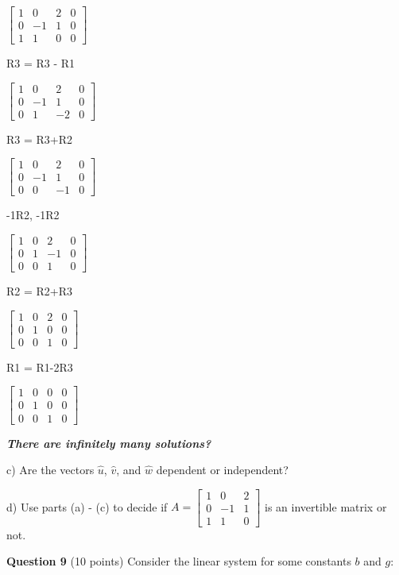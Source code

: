 \documentclass{article}
\begin{document}
$\begin{bmatrix}
    1 & 0 & 2 & 0 \\
    0 & -1 & 1 & 0 \\
    1 & 1 & 0 & 0
\end{bmatrix}$

R3 = R3 - R1

$\begin{bmatrix}
    1 & 0 & 2 & 0 \\
    0 & -1 & 1 & 0 \\
    0 & 1 & -2 & 0
\end{bmatrix}$

R3 = R3+R2

$\begin{bmatrix}
    1 & 0 & 2 & 0 \\
    0 & -1 & 1 & 0 \\
    0 & 0 & -1 & 0
\end{bmatrix}$

-1R2, -1R2

$\begin{bmatrix}
    1 & 0 & 2 & 0 \\
    0 & 1 & -1 & 0 \\
    0 & 0 & 1 & 0
\end{bmatrix}$

R2 = R2+R3

$\begin{bmatrix}
    1 & 0 & 2 & 0 \\
    0 & 1 & 0 & 0 \\
    0 & 0 & 1 & 0
\end{bmatrix}$

R1 = R1-2R3

$\begin{bmatrix}
    1 & 0 & 0 & 0 \\
    0 & 1 & 0 & 0 \\
    0 & 0 & 1 & 0
\end{bmatrix}$

\textbf{\textit{There are infinitely many solutions?}}

c) Are the vectors $\hat{u}$, $\hat{v}$, and $\hat{w}$ dependent or independent?

d) Use parts (a) - (c) to decide if $A = \begin{bmatrix}
    1 & 0 & 2 \\
    0 & -1 & 1 \\
    1 & 1 & 0
\end{bmatrix}$ is an invertible matrix or not.

\vspace{2em}
\noindent
\textbf{Question 9} (10 points) Consider the linear system for some constants $b$ and $g$:
\end{document}
